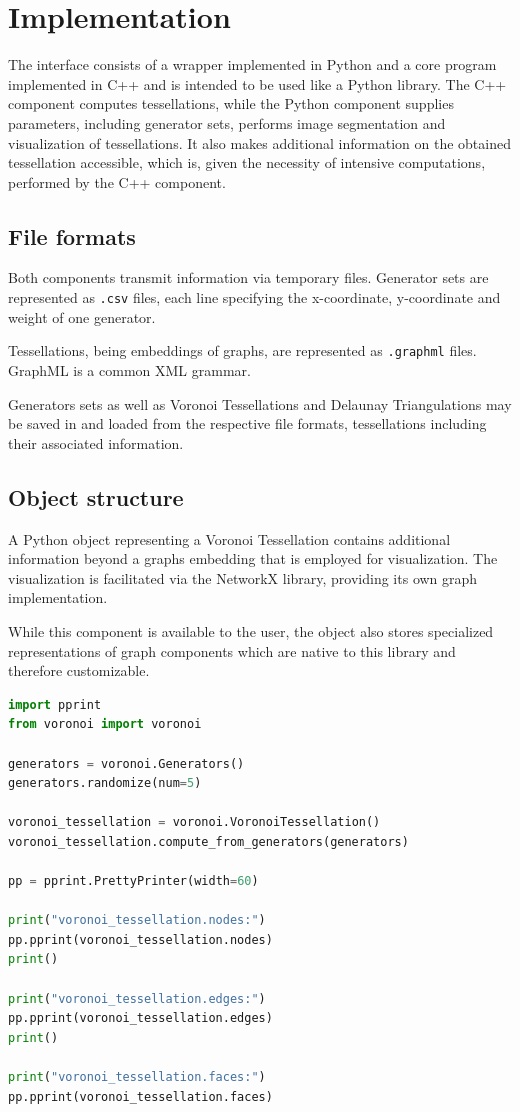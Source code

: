 \documentclass[a4paper]{article}
\begin{document}
\section{Implementation}
The interface consists of a wrapper implemented in Python and a core program implemented in C++ and is intended
to be used like a Python library. The C++ component computes tessellations, while the Python component supplies parameters,
including generator sets, performs image segmentation and visualization of tessellations.
It also makes additional information on the obtained tessellation accessible, which is,
given the necessity of intensive computations, performed by the C++ component.

\subsection{File formats}
Both components transmit information via temporary files. Generator sets are represented as \texttt{.csv} files,
each line specifying the x-coordinate, y-coordinate and weight of one generator.

Tessellations, being embeddings of graphs, are represented as \texttt{.graphml} files. GraphML is a common XML grammar.

Generators sets as well as Voronoi Tessellations and Delaunay Triangulations may be saved in and loaded from the respective
file formats, tessellations including their associated information.

\subsection{Object structure}
A Python object representing a Voronoi Tessellation contains additional information beyond a graphs embedding
that is employed for visualization. The visualization is facilitated via the NetworkX library, providing
its own graph implementation.

While this component is available to the user, the object also stores specialized representations of graph components
which are native to this library and therefore customizable.

\lstset{style=python_code}
\begin{lstlisting}[language=Python, 
	caption={Python code to output the components of a \texttt{VoronoiTessellation} object}, captionpos=b]
import pprint
from voronoi import voronoi

generators = voronoi.Generators()
generators.randomize(num=5)

voronoi_tessellation = voronoi.VoronoiTessellation()
voronoi_tessellation.compute_from_generators(generators)

pp = pprint.PrettyPrinter(width=60)

print("voronoi_tessellation.nodes:")
pp.pprint(voronoi_tessellation.nodes)
print()

print("voronoi_tessellation.edges:")
pp.pprint(voronoi_tessellation.edges)
print()

print("voronoi_tessellation.faces:")
pp.pprint(voronoi_tessellation.faces)
\end{lstlisting}
\end{document}
